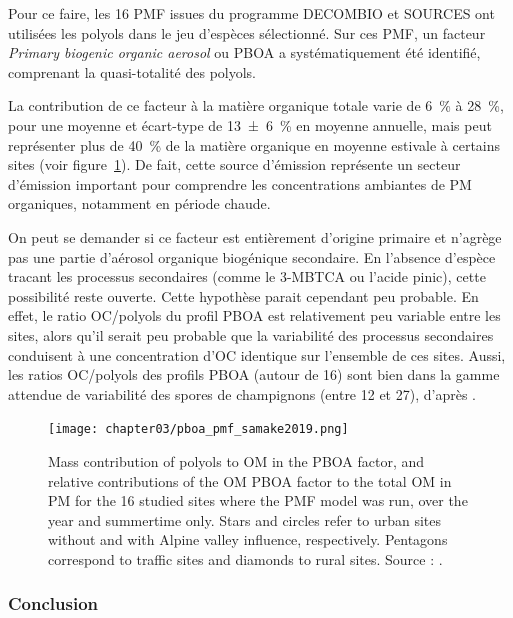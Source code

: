 Pour ce faire, les 16 PMF issues du programme DECOMBIO et SOURCES ont utilisées les polyols
dans le jeu d'espèces sélectionné. Sur ces PMF, un facteur \textit{Primary biogenic
organic aerosol} ou PBOA a systématiquement été identifié, comprenant la quasi-totalité
des polyols.

La contribution de ce facteur à la matière organique totale varie de \SI{6}{\percent} à \SI{28}{\percent}, pour une
moyenne et écart-type de \SI{13\pm6}{\percent} en moyenne annuelle, mais peut représenter
plus de \SI{40}{\percent} de la matière organique en moyenne estivale à certains sites (voir
figure~\ref{fig:chapter03/pboa_pmf_samake2019}).
De fait, cette source d'émission représente un secteur d'émission important pour comprendre
les concentrations ambiantes de PM organiques, notamment en période chaude.

On peut se demander si ce facteur est entièrement d'origine primaire et n'agrège pas une
partie d'aérosol organique biogénique secondaire. En l'absence d'espèce tracant les
processus secondaires (comme le 3-MBTCA ou l'acide pinic), cette possibilité reste
ouverte.  Cette hypothèse parait cependant peu probable. En effet, le ratio OC/polyols du
profil PBOA est relativement peu variable entre les sites, alors qu'il serait peu
probable que la variabilité des processus secondaires conduisent à une concentration d'OC
identique sur l'ensemble de ces sites.  Aussi, les ratios OC/polyols des profils PBOA
(autour de 16) sont bien dans la gamme attendue de variabilité des spores de champignons
(entre 12 et 27), d'après \cite{bauerSignificant2008,yttriSource2011}.

\begin{figure}[ht]
    \centering
    \texttt{[image: chapter03/pboa\_pmf\_samake2019.png]}
    \caption{
        Mass contribution of polyols to OM in the PBOA factor, and relative contributions
        of the OM PBOA factor to the total OM in PM for the 16 studied sites where the
        PMF model was run, over the year and summertime only. Stars and circles refer to
        urban sites without and with Alpine valley influence, respectively. Pentagons
        correspond to traffic sites and diamonds to rural sites.
        Source : \cite[figure 9]{samakePolyols2019}.
    }%
    \label{fig:chapter03/pboa_pmf_samake2019}
\end{figure}

\subsubsection{Conclusion}%
\label{ssub:conclusion_polyols}

